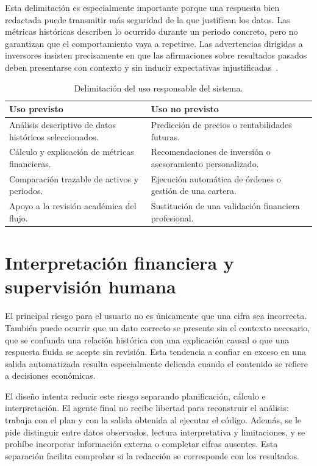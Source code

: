 Esta delimitación es especialmente importante porque una respuesta bien redactada puede transmitir más seguridad de la que justifican los datos. Las métricas históricas describen lo ocurrido durante un periodo concreto, pero no garantizan que el comportamiento vaya a repetirse. Las advertencias dirigidas a inversores insisten precisamente en que las afirmaciones sobre resultados pasados deben presentarse con contexto y sin inducir expectativas injustificadas~\cite{investorgov2022performanceclaims}.

\begin{table}[H]
\centering
\small
\begin{tabularx}{\textwidth}{L{0.30\textwidth}Y}
\toprule
\textbf{Uso previsto} & \textbf{Uso no previsto} \\
\midrule
Análisis descriptivo de datos históricos seleccionados. & Predicción de precios o rentabilidades futuras. \\
Cálculo y explicación de métricas financieras. & Recomendaciones de inversión o asesoramiento personalizado. \\
Comparación trazable de activos y periodos. & Ejecución automática de órdenes o gestión de una cartera. \\
Apoyo a la revisión académica del flujo. & Sustitución de una validación financiera profesional. \\
\bottomrule
\end{tabularx}
\caption{Delimitación del uso responsable del sistema.}
\label{tab:uso_previsto_sistema}
\end{table}

\section{Interpretación financiera y supervisión humana}

El principal riesgo para el usuario no es únicamente que una cifra sea incorrecta. También puede ocurrir que un dato correcto se presente sin el contexto necesario, que se confunda una relación histórica con una explicación causal o que una respuesta fluida se acepte sin revisión. Esta tendencia a confiar en exceso en una salida automatizada resulta especialmente delicada cuando el contenido se refiere a decisiones económicas.

El diseño intenta reducir este riesgo separando planificación, cálculo e interpretación. El agente final no recibe libertad para reconstruir el análisis: trabaja con el plan y con la salida obtenida al ejecutar el código. Además, se le pide distinguir entre datos observados, lectura interpretativa y limitaciones, y se prohíbe incorporar información externa o completar cifras ausentes. Esta separación facilita comprobar si la redacción se corresponde con los resultados.

